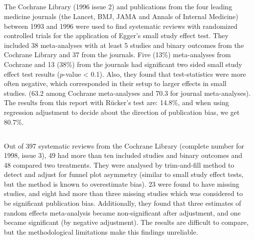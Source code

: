 \documentclass[11pt,a4paper,twoside]{book}\usepackage[]{graphicx}\usepackage[]{color}
\begin{document}
\subsection{\citet{Egger}}
The Cochrane Library (1996 issue 2) and publications from the four leading medicine journals (the Lancet, BMJ, JAMA and Annals of Internal Medicine) between 1993 and 1996 were used to find systematic reviews with randomized controlled trials for the application of Egger's small study effect test. They included 38 meta-analyses with at least 5 studies and binary outcomes from the Cochrane Library and 37 from the journals. Five (13\%) meta-analyses from Cochrane and 13 (38\%) from the journals had significant two sided small study effect test results ($p$-value < 0.1). Also, they found that test-statistics were more often negative, which corresponded in their setup to larger effects in small studies. (63.2 among Cochrane meta-analyses and 70.3 for journal meta-analyses). The results from this report with R\"ucker's test are: 14.8\%, and when using regression adjustment to decide about the direction of publication bias, we get 80.7\%.


\subsection{\citet{sutton.2000}}
Out of 397 systematic reviews from the Cochrane Library (complete number for 1998, issue 3), 49 had more than ten included studies and binary outcomes and 48 compared two treatments. They were analysed by trim-and-fill method \citep{trimfill} to detect and adjust for funnel plot asymmetry (similar to small study effect tests, but the method is known to overestimate bias). 23 were found to have missing studies, and eight had more than three missing studies which was considered to be significant publication bias. Additionally, they found that three estimates of random effects meta-analysis became non-significant after adjustment, and one became significant (by negative adjustment). The results are difficult to compare, but the methodological limitations make this findings unreliable.
\end{document}
